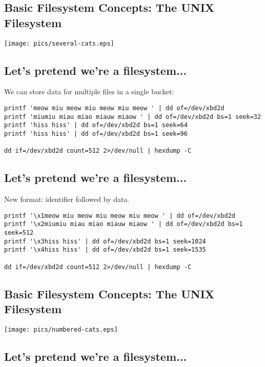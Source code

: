 \documentclass[xga]{xdvislides}
\begin{document}
\subsection{Basic Filesystem Concepts: The UNIX Filesystem}
\begin{center}
\texttt{[image: pics/several-cats.eps]} \\
\end{center}

\subsection{Let's pretend we're a filesystem...}

We can store data for multiple files in a single
bucket:
\begin{verbatim}
printf 'meow miu meow miu meow miu meow ' | dd of=/dev/xbd2d
printf 'miumiu miau miao miauw miaow ' | dd of=/dev/xbd2d bs=1 seek=32
printf 'hiss hiss' | dd of=/dev/xbd2d bs=1 seek=64
printf 'hiss hiss' | dd of=/dev/xbd2d bs=1 seek=96

dd if=/dev/xbd2d count=512 2>/dev/null | hexdump -C
\end{verbatim}

\subsection{Let's pretend we're a filesystem...}

New format: identifier followed by data.
\begin{verbatim}
printf '\x1meow miu meow miu meow miu meow ' | dd of=/dev/xbd2d
printf '\x2miumiu miau miao miauw miaow ' | dd of=/dev/xbd2d bs=1 seek=512
printf '\x3hiss hiss' | dd of=/dev/xbd2d bs=1 seek=1024
printf '\x4hiss hiss' | dd of=/dev/xbd2d bs=1 seek=1535

dd if=/dev/xbd2d count=512 2>/dev/null | hexdump -C
\end{verbatim}

\subsection{Basic Filesystem Concepts: The UNIX Filesystem}
\vspace*{\fill}
\begin{center}
\texttt{[image: pics/numbered-cats.eps]}
\end{center}
\vspace*{\fill}


\subsection{Let's pretend we're a filesystem...}
\end{document}
